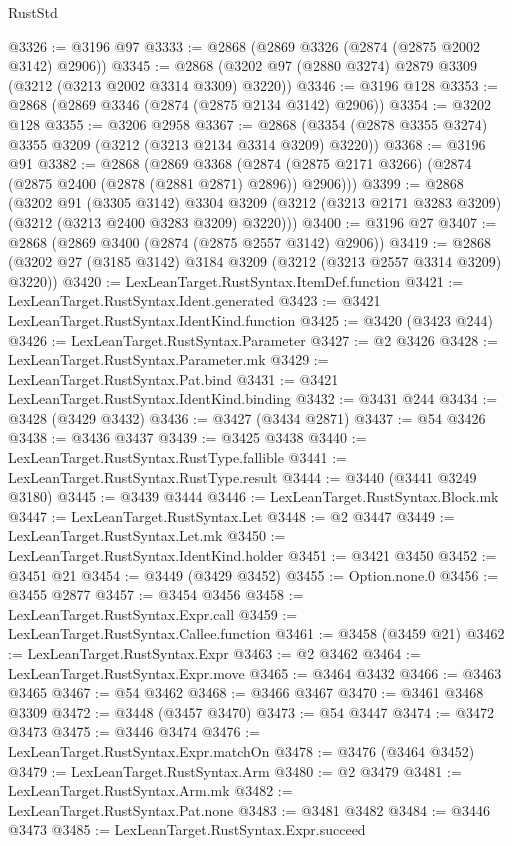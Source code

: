 \begin{lexlean}{RustStd}
\begin{coremodule}
{{{{{{{{{{{{{{{{{{{@3326 := @3196 @97
@3333 := @2868 (@2869 @3326 (@2874 (@2875 @2002 @3142) @2906))
@3345 := @2868 (@3202 @97 (@2880 @3274) @2879 @3309 (@3212 (@3213 @2002 @3314 @3309) @3220))
@3346 := @3196 @128
@3353 := @2868 (@2869 @3346 (@2874 (@2875 @2134 @3142) @2906))
@3354 := @3202 @128
@3355 := @3206 @2958
@3367 := @2868 (@3354 (@2878 @3355 @3274) @3355 @3209 (@3212 (@3213 @2134 @3314 @3209) @3220))
@3368 := @3196 @91
@3382 := @2868
    (@2869
      @3368
      (@2874 (@2875 @2171 @3266) (@2874 (@2875 @2400 (@2878 (@2881 @2871) @2896)) @2906)))
@3399 := @2868
    (@3202
      @91
      (@3305 @3142)
      @3304
      @3209
      (@3212 (@3213 @2171 @3283 @3209) (@3212 (@3213 @2400 @3283 @3209) @3220)))
@3400 := @3196 @27
@3407 := @2868 (@2869 @3400 (@2874 (@2875 @2557 @3142) @2906))
@3419 := @2868 (@3202 @27 (@3185 @3142) @3184 @3209 (@3212 (@3213 @2557 @3314 @3209) @3220))
@3420 := LexLeanTarget.RustSyntax.ItemDef.function
@3421 := LexLeanTarget.RustSyntax.Ident.generated
@3423 := @3421 LexLeanTarget.RustSyntax.IdentKind.function
@3425 := @3420 (@3423 @244)
@3426 := LexLeanTarget.RustSyntax.Parameter
@3427 := @2 @3426
@3428 := LexLeanTarget.RustSyntax.Parameter.mk
@3429 := LexLeanTarget.RustSyntax.Pat.bind
@3431 := @3421 LexLeanTarget.RustSyntax.IdentKind.binding
@3432 := @3431 @244
@3434 := @3428 (@3429 @3432)
@3436 := @3427 (@3434 @2871)
@3437 := @54 @3426
@3438 := @3436 @3437
@3439 := @3425 @3438
@3440 := LexLeanTarget.RustSyntax.RustType.fallible
@3441 := LexLeanTarget.RustSyntax.RustType.result
@3444 := @3440 (@3441 @3249 @3180)
@3445 := @3439 @3444
@3446 := LexLeanTarget.RustSyntax.Block.mk
@3447 := LexLeanTarget.RustSyntax.Let
@3448 := @2 @3447
@3449 := LexLeanTarget.RustSyntax.Let.mk
@3450 := LexLeanTarget.RustSyntax.IdentKind.holder
@3451 := @3421 @3450
@3452 := @3451 @21
@3454 := @3449 (@3429 @3452)
@3455 := Option.none.{0}
@3456 := @3455 @2877
@3457 := @3454 @3456
@3458 := LexLeanTarget.RustSyntax.Expr.call
@3459 := LexLeanTarget.RustSyntax.Callee.function
@3461 := @3458 (@3459 @21)
@3462 := LexLeanTarget.RustSyntax.Expr
@3463 := @2 @3462
@3464 := LexLeanTarget.RustSyntax.Expr.move
@3465 := @3464 @3432
@3466 := @3463 @3465
@3467 := @54 @3462
@3468 := @3466 @3467
@3470 := @3461 @3468 @3309
@3472 := @3448 (@3457 @3470)
@3473 := @54 @3447
@3474 := @3472 @3473
@3475 := @3446 @3474
@3476 := LexLeanTarget.RustSyntax.Expr.matchOn
@3478 := @3476 (@3464 @3452)
@3479 := LexLeanTarget.RustSyntax.Arm
@3480 := @2 @3479
@3481 := LexLeanTarget.RustSyntax.Arm.mk
@3482 := LexLeanTarget.RustSyntax.Pat.none
@3483 := @3481 @3482
@3484 := @3446 @3473
@3485 := LexLeanTarget.RustSyntax.Expr.succeed
}}}}}}}}}}}}}}}}}}}
\end{coremodule}
\end{lexlean}
